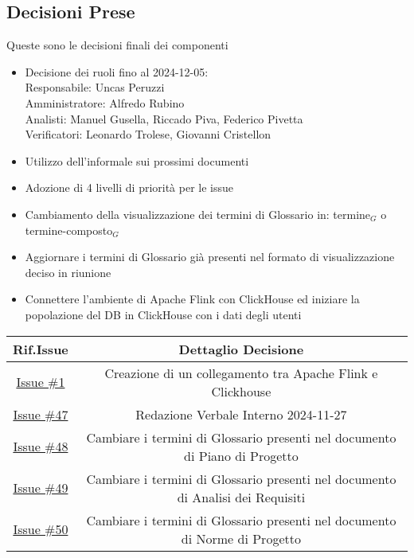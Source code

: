 \documentclass[10pt]{article}
\begin{document}
\subsection{Decisioni Prese}
Queste sono le decisioni finali dei componenti
\begin{itemize}
\item Decisione dei ruoli fino al 2024-12-05:\\
Responsabile: Uncas Peruzzi\\
Amministratore: Alfredo Rubino\\
Analisti: Manuel Gusella, Riccado Piva, Federico Pivetta\\
Verificatori: Leonardo Trolese, Giovanni Cristellon\\
\item Utilizzo dell'informale sui prossimi documenti
\item Adozione di 4 livelli di priorità per le issue
\item Cambiamento della visualizzazione dei termini di Glossario in: termine$_G$ o termine-composto$_G$
\item Aggiornare i termini di Glossario già presenti nel formato di visualizzazione deciso in riunione
\item Connettere l'ambiente di Apache Flink con ClickHouse ed iniziare la popolazione del DB in ClickHouse con i dati degli utenti
\end{itemize}
\begin{center}
\begin{tabular}{|>{\hspace{20pt}}c<{\hspace{20pt}}|>{\hspace{20pt}}c<{\hspace{20pt}}|}
	\hline
	\textbf{Rif.Issue} & \textbf{Dettaglio Decisione}\\
	\hline
	\href{https://github.com/SevenBitsSwe/PoC/issues/1}{Issue \#1} &  Creazione di un collegamento tra Apache Flink e Clickhouse\\
	\hline
	\href{https://github.com/SevenBitsSwe/7BitsDocs/issues/47}{Issue \#47} &  Redazione Verbale Interno 2024-11-27\\
	\hline
	\href{https://github.com/SevenBitsSwe/7BitsDocs/issues/48}{Issue \#48} &  Cambiare i termini di Glossario presenti nel documento di Piano di Progetto\\
	\hline
	\href{https://github.com/SevenBitsSwe/7BitsDocs/issues/49}{Issue \#49} &  Cambiare i termini di Glossario presenti nel documento di Analisi dei Requisiti\\
	\hline
	\href{https://github.com/SevenBitsSwe/7BitsDocs/issues/50}{Issue \#50} &  Cambiare i termini di Glossario presenti nel documento di Norme di Progetto\\
	\hline
\end{tabular}
\end{center}
\end{document}
